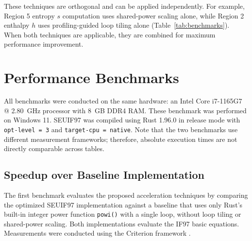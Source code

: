 \documentclass{article}
\begin{document}
These techniques are orthogonal and can be applied independently. For example, Region 5 entropy $s$ computation uses shared-power scaling alone, while Region 2 enthalpy $h$ uses profiling-guided loop tiling alone (Table~\ref{tab:benchmarks}). When both techniques are applicable, they are combined for maximum performance improvement.

\section{Performance Benchmarks}
\label{sec:performance-benchmarks}

All benchmarks were conducted on the same hardware: an Intel Core i7-1165G7 @ 2.80~GHz processor with 8~GB DDR4 RAM. 
These benchmark was performed on Windows 11. SEUIF97 was compiled using Rust 1.96.0 in release mode with \texttt{opt-level = 3} and \texttt{target-cpu = native}.
Note that the two benchmarks use different measurement frameworks; therefore, absolute execution times are not directly comparable across tables.

\subsection{Speedup over Baseline Implementation}

The first benchmark evaluates the proposed acceleration techniques 
by comparing the optimized SEUIF97 implementation against a baseline 
that uses only Rust's built-in integer power function \texttt{powi()} with a single loop, without loop tiling or shared-power scaling. 
Both implementations evaluate the IF97 basic equations.
Measurements were conducted using the Criterion framework \cite{Criterion}.
\end{document}
